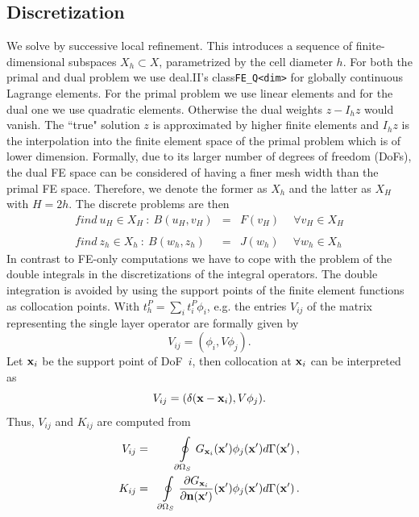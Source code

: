 \documentclass[runningheads]{lncse}
\begin{document}
\subsection{Discretization}

We solve by successive local refinement. This introduces a sequence of finite-dimensional subspaces ${X_h} \subset X$, parametrized by the cell diameter $h$.
%
For both the primal and dual problem we use deal.II's class\verb|FE_Q<dim>| for globally continuous Lagrange elements. 
%
For the primal problem we use linear elements and for the dual one we use quadratic elements. Otherwise the dual weights $z -I_h z$ would vanish. The ``true" solution $z$ is approximated by higher finite elements and $I_h z$ is the interpolation into the finite element space of the primal problem which is of lower dimension.
%
Formally, due to its larger number of degrees of freedom (DoFs), the dual FE space can be considered of having a finer mesh width than the primal FE space. Therefore, we denote the former as $X_h$ and the latter as $X_H$ with $H= 2h$.
%
The discrete problems are then 
%
\begin{eqnarray}
\label{eq:prim-p-fe}
find ~ u_H \in X_H ~: ~ B(u_H,v_H) & = & F(v_H) ~ \quad \forall v_H \in X_H \\
%
\nonumber \\
\label{eq:dual-p-fe}
find ~ z_h \in X_h ~: ~ B(w_h,z_h) & = & J(w_h) ~  \quad \forall w_h \in X_h  
\end{eqnarray}
%
In contrast to FE-only computations we have to cope with the problem of the double integrals in the discretizations of the integral operators. The double integration is avoided by using the support points of the finite element functions as collocation points.
%
With $t^P_h = \sum_i t^P_i \phi_i$, e.g. the entries $V_{ij}$ of the matrix representing the single layer operator are formally given by
$$
V_{ij} = (\phi_i , V \phi_j ).
$$ 
Let ${\bf x}_i$ be the support point of DoF~$i$, then collocation at ${\bf x}_i$ can be interpreted as 
$$
V_{ij} = (\delta ({\bf x} - {\bf x}_i) , V \phi_j ).
$$ 
Thus, $V_{ij}$ and $K_{ij}$ are computed from 
\begin{eqnarray}
V_{ij} & = & \oint\limits_{\partial \Omega_S}
 G_{{\bf x}_i}({\bf x}') 
     \phi_j({\bf x}')
 d\Gamma ({\bf x}')  \,, \\
%
K_{ij} & = & %
\oint\limits_{\partial \Omega_S}
\frac{\partial G_{{\bf x}_i} }{\partial{\bf n}({\bf x}') }({\bf x}') 
     \phi_j({\bf x}')
 d\Gamma ({\bf x}')  \,.
\end{eqnarray}
\end{document}
